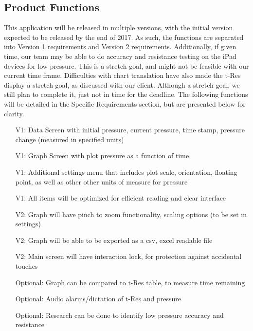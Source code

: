 \documentclass[onecolumn, draftclsnofoot,10pt, compsoc]{IEEEtran}
\begin{document}
\subsection{Product Functions}
This application will be released in multiple versions, with the initial version expected to be released by the end of 2017.
As such, the functions are separated into Version 1 requirements and Version 2 requirements.
Additionally, if given time, our team may be able to do accuracy and resistance testing on the iPad devices for low pressure.
This is a stretch goal, and might not be feasible with our current time frame.
Difficulties with chart translation have also made the t-Res display a stretch goal, as discussed with our client.
Although a stretch goal, we still plan to complete it, just not in time for the deadline.
The following functions will be detailed in the Specific Requirements section, but are presented below for clarity.
\begin{itemize}
\item[V1:] Data Screen with initial pressure, current pressure, time stamp, pressure change (measured in specified units)
\item[V1:] Graph Screen with plot pressure as a function of time
\item[V1:] Additional settings menu that includes plot scale, orientation, floating point, as well as other other units of measure for pressure
\item[V1:] All items will be optimized for efficient reading and clear interface
\item[V2:] Graph will have pinch to zoom functionality, scaling options (to be set in settings)
\item[V2:] Graph will be able to be exported as a csv, excel readable file
\item[V2:] Main screen will have interaction lock, for protection against accidental touches
\item[Optional:] Graph can be compared to t-Res table, to measure time remaining
\item[Optional:] Audio alarms/dictation of t-Res and pressure
\item[Optional:] Research can be done to identify low pressure accuracy and resistance
\end{itemize}
\end{document}
